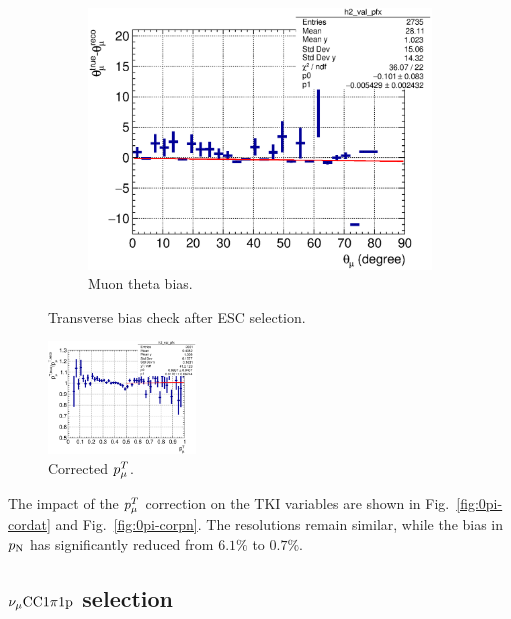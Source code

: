 \begin{figure}[!htb]
           \begin{subfigure}{0.3\textwidth}
                \includegraphics[width=\textwidth]{figures/theta_mu_vs_theta_mu_res_hist2d_al14.eps}
                \caption{Muon theta bias.}
                \label{fig:0pi-mutheta-bias}
           \end{subfigure}
           \caption{Transverse bias check after ESC selection.}
           \label{fig:0piptbiascheck}
        \end{figure}
            
        \begin{figure}[!htb] 	
            \centering 		
            \includegraphics[width=0.35\textwidth]{figures/mu_pt_vs_cor_mu_pt_bias_hist2d_al14.eps}
            \caption{\label{fig:cormupt} Corrected $p_{\mu}^T$.} 
        \end{figure}

        The impact of the $p_{\mu}^T$ correction on the TKI variables are shown in Fig.~\ref{fig:0pi-cordat} and Fig.~\ref{fig:0pi-corpn}. The resolutions remain similar, while the bias in $p_\textrm{N}$ has significantly reduced from $6.1\%$ to $0.7\%$.


    \subsection{\label{sec:1pi-tki}$\nu_{\mu}\textrm{CC}1\pi1\textrm{p}$ selection}
